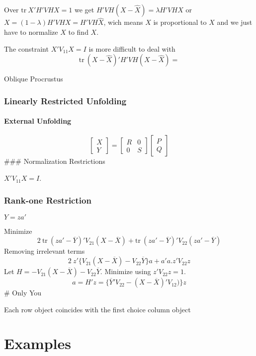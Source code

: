 \documentclass[
  12pt,
]{article}
\begin{document}
Over \(\text{tr}\ X'H'VHX=1\) we get \(H'VH(X-\hat X)=\lambda H'VHX\) or
\(X=(1-\lambda)H'VHX=H'VH\hat X\), wich means \(X\) is proportional to \(\hat X\) and we just have to normalize \(\hat X\) to find \(X\).

The constraint \(X'V_{11}X=I\) is more difficult to deal with
\[
\text{tr}\ (X-\hat X)'H'VH(X-\hat X)=
\]

Oblique Procrustus

\subsubsection{Linearly Restricted Unfolding}\label{linearly-restricted-unfolding}

\paragraph{External Unfolding}\label{external-unfolding}

\[
\begin{bmatrix}
X\\Y
\end{bmatrix}=
\begin{bmatrix}
R&0\\
0&S
\end{bmatrix}
\begin{bmatrix}
P\\
Q
\end{bmatrix}
\]
\#\#\# Normalization Restrictions

\(X'V_{11}X=I\).

\subsubsection{Rank-one Restriction}\label{rank-one-restriction}

\(Y=za'\)

Minimize
\[
2\ \text{tr}\ (za'-\overline{Y})'V_{21}(X-\overline{X})+
\text{tr}\ (za'-\overline{Y})'V_{22}(za'-\overline{Y})
\]
Removing irrelevant terms
\[
2\ z'\{V_{21}(X-\overline{X})-V_{22}\overline{Y}\}a+
a'a.z'V_{22}z
\]
Let \(H=-V_{21}(X-\overline{X})-V_{22}\overline{Y}\). Minimize using \(z'V_{22}z=1\).
\[
a=H'z=\{\overline{Y}'V_{22}-(X-\overline{X})'V_{12})\}z
\]
\# Only You

Each row object coincides with the first choice column object

\section{Examples}\label{examples}
\end{document}

